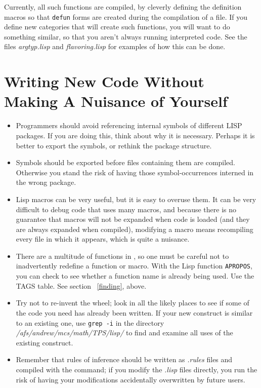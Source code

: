 Currently, all such functions are compiled, by cleverly defining the definition
macros so that {\tt defun} forms are created during the compilation of a file.
If you define new categories that will create such functions, you will want
to do something similar, so that you aren't always running interpreted code.
See the files {\it argtyp.lisp} and {\it flavoring.lisp} for examples of how
this can be done.

\section{Writing New Code Without Making A Nuisance of Yourself}
\label{writing}

\begin{itemize}
\item Programmers should avoid referencing internal symbols of different
LISP packages.  If you are doing this, think about why it is
necessary.  Perhaps it is better to export the symbols, or rethink the
package structure.

\item Symbols should be exported before files containing them are compiled.
Otherwise you stand the risk of having those symbol-occurrences
interned in the wrong package.

\item Lisp macros can be very useful, but it is easy to overuse them.  It
can be very difficult to debug code that uses many macros, and because
there is no guarantee that macros will not be expanded when code is
loaded (and they are always expanded when compiled), modifying a macro
means recompiling every file in which it appears, which is quite a nuisance.

\item There are a multitude of functions in \tps, so one must be careful not
to inadvertently redefine a function or macro.  With the Lisp function
{\tt APROPOS}, you can check to see
whether a function name is already being used.
Use the TAGS table. See section ~\ref{finding}, above.

\item Try not to re-invent the wheel; look in all the likely places to see if some
of the code you need has already been written. If your new construct is
similar to an existing one, use {\tt grep -i} in the directory 
{\it /afs/andrew/mcs/math/TPS/lisp/} to find and examine all uses of the existing 
construct.

\item Remember that rules of inference should be written as {\it .rules} files and compiled 
with the  command; if you modify the {\it .lisp} files 
directly, you run the risk of having your modifications accidentally overwritten
by future users.


\end{itemize}

